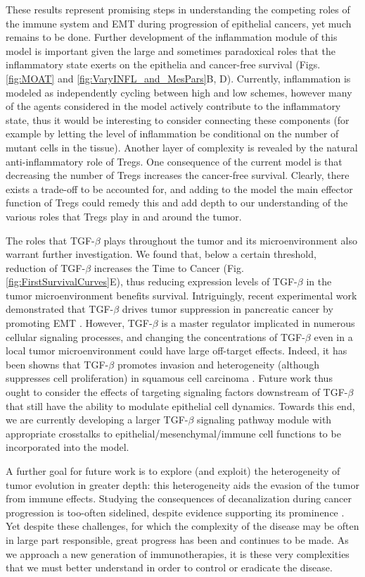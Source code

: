 \documentclass[11pt]{article}
\begin{document}
These results represent promising steps in understanding the competing roles of the immune system and EMT during progression of epithelial cancers, yet much remains to be done. Further development of the inflammation module of this model is important given the large and sometimes paradoxical roles that the inflammatory state exerts on the epithelia and cancer-free survival (Figs. \ref{fig:MOAT} and \ref{fig:VaryINFL_and_MesPars}B, D). Currently, inflammation is modeled as independently cycling between high and low schemes, however many of the agents considered in the model actively contribute to the inflammatory state, thus it would be interesting to consider connecting these components (for example by letting the level of inflammation be conditional on the number of mutant cells in the tissue). Another layer of complexity is revealed by the natural anti-inflammatory role of Tregs. One consequence of the current model is that decreasing the number of Tregs increases the cancer-free survival. Clearly, there exists a trade-off to be accounted for, and adding to the model the main effector function of Tregs could remedy this and add depth to our understanding of the various roles that Tregs play in and around the tumor.
\par
The roles that TGF-$\beta$ plays throughout the tumor and its microenvironment also warrant further investigation. We found that, below a certain threshold, reduction of TGF-$\beta$ increases the Time to Cancer  (Fig. \ref{fig:FirstSurvivalCurves}E), thus reducing expression levels of TGF-$\beta$ in the tumor microenvironment benefits survival. Intriguingly, recent experimental work demonstrated that TGF-$\beta$ drives tumor suppression in pancreatic cancer by promoting EMT \cite{david16_tgfv}. However, TGF-$\beta$ is a master regulator implicated in numerous cellular signaling processes, and changing the concentrations of TGF-$\beta$ even in a local tumor microenvironment could have large off-target effects. Indeed, it has been showns that TGF-$\beta$ promotes invasion and heterogeneity (although suppresses cell proliferation) in squamous cell carcinoma \cite{oshimori15_tgfv}. Future work thus ought to consider the effects of targeting signaling factors downstream of TGF-$\beta$ that still have the ability to modulate epithelial cell dynamics. Towards this end, we are currently developing a larger TGF-$\beta$ signaling pathway module with appropriate crosstalks to  epithelial/mesenchymal/immune cell functions to be incorporated into the model.
\par
A further goal for future work is to explore (and exploit) the heterogeneity of tumor evolution in greater depth: this heterogeneity aids the evasion of the tumor from immune effects. Studying the consequences of decanalization \cite{gibson09_decanalization} during cancer progression is too-often sidelined, despite evidence supporting its prominence \cite{cyll17_tumour, punt17_tumour, dagogo-jack18_tumour}. Yet despite these challenges, for which the complexity of the disease may be often in large part responsible, great progress has been and continues to be made. As we approach a new generation of immunotherapies, it is these very complexities that we must better understand in order to control or eradicate the disease.
\end{document}
